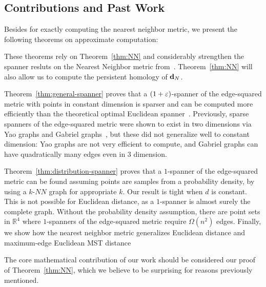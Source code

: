 \subsection{Contributions and Past Work}
Besides for exactly computing the nearest neighbor metric, we present the
following theorems on approximate computation:

 
These theorems rely on Theorem~\ref{thm:NN} and considerably strengthen the
spanner resluts on the Nearest Neighbor metric
from~\cite{cohen15approximating}. Theorem~\ref{thm:NN} will also allow us
to compute the persistent homology of $\mathbf{d}_N$.

Theorem~\ref{thm:general-spanner} proves that a $(1+\varepsilon)$-spanner of the
edge-squared metric with points in constant dimension is sparser and can be
computed more efficiently than the theoretical optimal Euclidean
spanner~\cite{}.  
Previously, sparse spanners of the edge-squared metric were shown to exist in two
dimensions via Yao graphs and Gabriel graphs~\cite{LiWan2001}, but these
did not generalize well to constant dimension: Yao
graphs are not very efficient to compute, and Gabriel graphs can have
quadratically many edges even in $3$ dimension.

Theorem~\ref{thm:distribution-spanner} proves that a $1$-spanner of
the edge-squared metric can be found assuming points are samples from a
probability density, by using a $k$-$NN$ graph for
appropriate $k$. Our result is tight when $d$ is constant. This
is not possible for Euclidean distance, as a $1$-spanner is almost
surely the complete graph. Without the probability density
assumption, there are point sets in $\mathbb{R}^4$ where
$1$-spanners
of the edge-squared metric require $\Omega(n^2)$ edges.  
Finally, we show how the nearest neighbor metric generalizes Euclidean
distance and maximum-edge Euclidean MST distance ~\cite{LiWan2001}

The core mathematical contribution of our work should be considered our
proof of Theorem~\ref{thm:NN}, which we believe to be surprising for
reasons previously mentioned.

